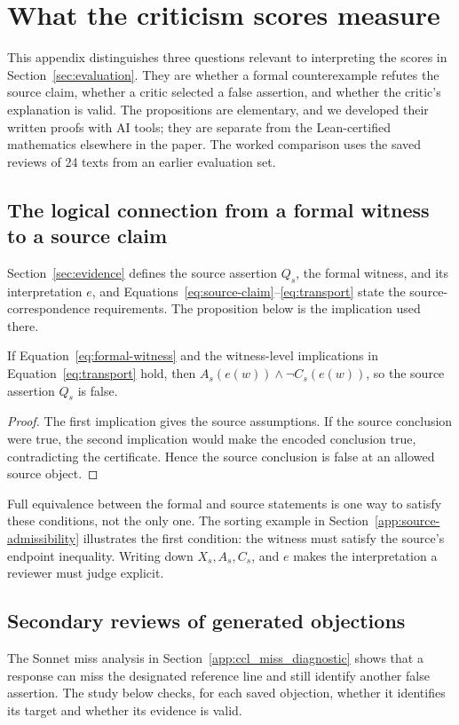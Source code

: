 \section{What the criticism scores measure}
\label{app:metrics}
This appendix distinguishes three questions relevant to interpreting the scores in Section~\ref{sec:evaluation}. They are whether a formal counterexample refutes the source claim, whether a critic selected a false assertion, and whether the critic's explanation is valid. The propositions are elementary, and we developed their written proofs with AI tools; they are separate from the Lean-certified mathematics elsewhere in the paper. The worked comparison uses the saved reviews of 24 texts from an earlier evaluation set.

\subsection{The logical connection from a formal witness to a source claim}
\label{app:transport}
Section~\ref{sec:evidence} defines the source assertion $Q_s$, the formal witness, and its interpretation $e$, and Equations~\eqref{eq:source-claim}--\eqref{eq:transport} state the source-correspondence requirements. The proposition below is the implication used there.

\begin{proposition}
\label{prop:transport}
If Equation~\eqref{eq:formal-witness} and the witness-level implications in Equation~\eqref{eq:transport} hold, then $A_s(e(w))\wedge\neg C_s(e(w))$, so the source assertion $Q_s$ is false.
\end{proposition}
\begin{proof}
The first implication gives the source assumptions. If the source conclusion were true, the second implication would make the encoded conclusion true, contradicting the certificate. Hence the source conclusion is false at an allowed source object.
\end{proof}
Full equivalence between the formal and source statements is one way to satisfy these conditions, not the only one. The sorting example in Section~\ref{app:source-admissibility} illustrates the first condition: the witness must satisfy the source's endpoint inequality. Writing down $X_s,A_s,C_s$, and $e$ makes the interpretation a reviewer must judge explicit.

\subsection{Secondary reviews of generated objections}
\label{app:secondary-objections}
The Sonnet miss analysis in Section~\ref{app:ccl_miss_diagnostic} shows that a response can miss the designated reference line and still identify another false assertion. The study below checks, for each saved objection, whether it identifies its target and whether its evidence is valid.

